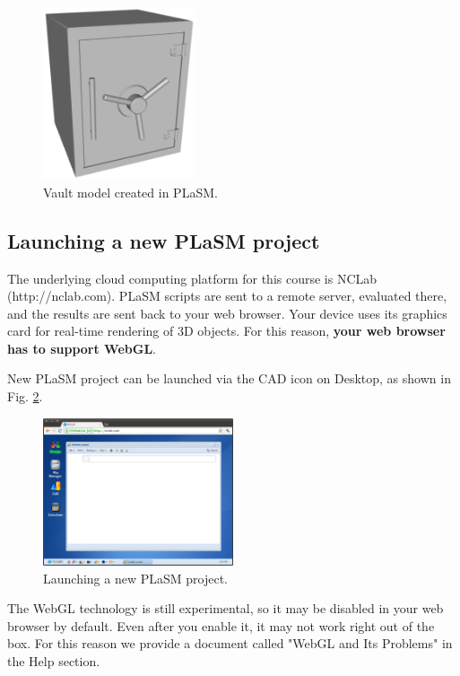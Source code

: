 \documentclass{article}
\begin{document}
\begin{figure}[!ht]
\begin{center}
\includegraphics[width=0.4\textwidth]{img/vault.png}
\end{center}
\vspace{-4mm}
\caption{Vault model created in PLaSM.}
\label{fig:vault0}
\end{figure}


\subsection{Launching a new PLaSM project}

The underlying cloud computing platform for this course is NCLab 
(http://nclab.com).
PLaSM scripts are sent to a remote server, evaluated there, 
and the results are sent back to your web browser. Your device uses
its graphics card for real-time rendering of 3D objects. For this 
reason, {\bf your web browser has to support WebGL}. 

New PLaSM project can be launched via the CAD icon on Desktop, as shown 
in Fig. \ref{fig:python}.

\begin{figure}[!ht]
\begin{center}
\includegraphics[width=0.5\textwidth]{img/python.png}
\end{center}
\vspace{-2mm}
\caption{Launching a new PLaSM project.}
\label{fig:python}
\end{figure}
\noindent
The WebGL technology is still experimental, so it may be disabled 
in your web browser by default. Even after you enable it, it may not work 
right out of the box. For this reason we provide a document called 
"WebGL and Its Problems" in the Help section.
\end{document}
